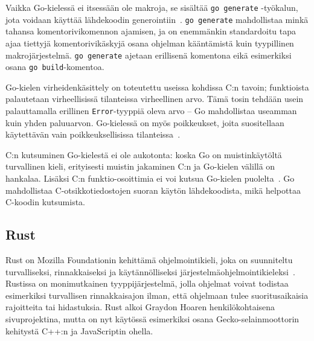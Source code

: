
Vaikka Go-kielessä ei itsessään ole makroja, se sisältää \texttt{go~generate}
-työkalun, jota voidaan käyttää lähdekoodin generointiin~\citep{gogenerate}.
\texttt{go~generate} mahdollistaa minkä tahansa komentorivikomennon ajamisen,
ja on enemmänkin standardoitu tapa ajaa tiettyjä komentorivikäskyjä osana
ohjelman kääntämistä kuin tyypillinen makrojärjestelmä.
\texttt{\mbox{go~generate}} ajetaan erillisenä komentona eikä esimerkiksi osana
\texttt{\mbox{go~build}}-komentoa.



Go-kielen virheidenkäsittely on toteutettu useissa kohdissa C:n tavoin;
funktioista palautetaan virheellisissä tilanteissa virheellinen arvo. Tämä
tosin tehdään usein palauttamalla erillinen \texttt{Error}-tyyppiä oleva arvo
-- Go mahdollistaa useamman kuin yhden paluuarvon. Go-kielessä on myös
poikkeukset, joita suositellaan käytettävän vain poikkeuksellisissa
tilanteissa~\citep{effectivego}.

C:n kutsuminen Go-kielestä ei ole aukotonta: koska Go on muistinkäytöltä
turvallinen kieli, erityisesti muistin jakaminen C:n ja Go-kielen välillä on
hankalaa. Lisäksi C:n funktio-osoittimia ei voi kutsua Go-kielen
puolelta~\citep{cgo}. Go mahdollistaa C-otsikkotiedostojen suoran käytön
lähdekoodista, mikä helpottaa C-koodin kutsumista.

\subsection{Rust}

Rust on Mozilla Foundationin kehittämä ohjelmointikieli, joka on suunniteltu
turvalliseksi, rinnakkaiseksi ja käytännölliseksi
järjestelmäohjelmointikieleksi~\citep{rustfaq}. Rustissa on monimutkainen
tyyppijärjestelmä, jolla ohjelmat voivat todistaa esimerkiksi turvallisen
rinnakkaisajon ilman, että ohjelmaan tulee suoritusaikaisia rajoitteita tai
hidastuksia. Rust alkoi Graydon Hoaren henkilökohtaisena sivuprojektina, mutta
on nyt käytössä esimerkiksi osana Gecko-se\-lain\-moot\-to\-rin kehitystä C++:n ja
JavaScriptin ohella.

